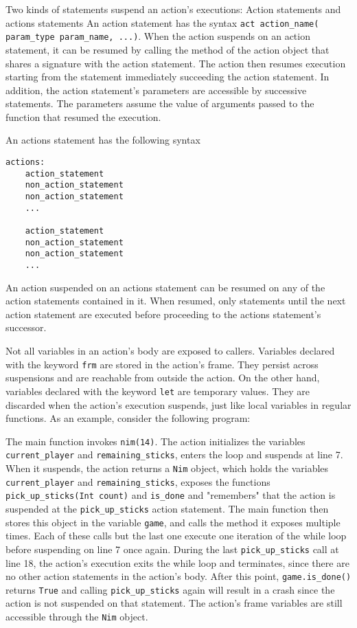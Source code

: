 Two kinds of statements suspend an action's executions: Action statements and actions statements
An action statement has the syntax \texttt{act action\_name( param\_type param\_name, ...)}.
When the action suspends on an action statement, it can be resumed by calling the method of the action object that shares a signature with the action statement.
The action then resumes execution starting from the statement immediately succeeding the action statement.
In addition, the action statement's parameters are accessible by successive statements.
The parameters assume the value of arguments passed to the function that resumed the execution.

An actions statement has the following syntax
\begin{lstlisting}
actions:
    action_statement
    non_action_statement
    non_action_statement
    ...

    action_statement
    non_action_statement
    non_action_statement
    ...
\end{lstlisting}
An action suspended on an actions statement can be resumed on any of the action statements contained in it.
When resumed, only statements until the next action statement are executed before proceeding to the actions statement's successor.


Not all variables in an action's body are exposed to callers.
Variables declared with the keyword \texttt{frm} are stored in the action's frame.
They persist across suspensions and are reachable from outside the action.
On the other hand, variables declared with the keyword \texttt{let} are temporary values.
They are discarded when the action's execution suspends, just like local variables in regular functions. As an example, consider the following program:



The main function invokes \texttt{nim(14)}.
The action initializes the variables \texttt{current\_player} and \texttt{remaining\_sticks}, enters the loop and suspends at line 7.
When it suspends, the action returns a \texttt{Nim} object, which holds the variables
 \texttt{current\_player} and \texttt{remaining\_sticks}, exposes the functions \texttt{pick\_up\_sticks(Int count)} and \texttt{is\_done\(\)} 
 and "remembers" that the action is suspended at the \texttt{pick\_up\_sticks} action statement.
The main function then stores this object in the variable \texttt{game}, and calls the method it exposes multiple times.
Each of these calls but the last one execute one iteration of the while loop before suspending on line 7 once again.
During the last \texttt{pick\_up\_sticks} call at line 18, the action's execution exits the while loop and terminates, since there are no other action statements in the action's body.
After this point, \texttt{game.is\_done()} returns \texttt{True} and calling \texttt{pick\_up\_sticks} again will result in a crash since the action is not suspended on that statement.
The action's frame variables are still accessible through the \texttt{Nim} object.

